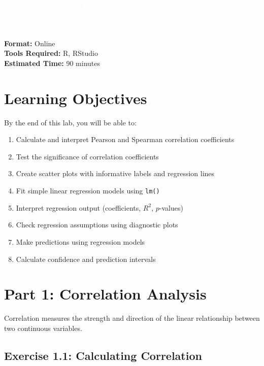 \documentclass[11pt]{article}
\title{}
\author{}
\date{}
\begin{document}
\begin{tcolorbox}[colback=osaorange,colframe=black,boxrule=2pt,arc=0pt,left=3pt,right=3pt,top=6pt,bottom=6pt,boxsep=2pt]
\centering
\textcolor{white}{\textbf{\Large H524 Introduction to Biostatistics}}\\
\textcolor{white}{\textbf{\Large Week 9 Lab: Correlation and Simple Linear Regression}}\\
\textcolor{white}{\textbf{\Large Fall 2025}}
\end{tcolorbox}

\vspace{8pt}

\noindent\textbf{Format:} Online\\
\textbf{Tools Required:} R, RStudio\\
\textbf{Estimated Time:} 90 minutes

\section{Learning Objectives}

By the end of this lab, you will be able to:
\begin{enumerate}
\item Calculate and interpret Pearson and Spearman correlation coefficients
\item Test the significance of correlation coefficients
\item Create scatter plots with informative labels and regression lines
\item Fit simple linear regression models using \texttt{lm()}
\item Interpret regression output (coefficients, $R^2$, $p$-values)
\item Check regression assumptions using diagnostic plots
\item Make predictions using regression models
\item Calculate confidence and prediction intervals
\end{enumerate}

\section{Part 1: Correlation Analysis}

Correlation measures the strength and direction of the linear relationship between two continuous variables.

\subsection{Exercise 1.1: Calculating Correlation}
\end{document}
